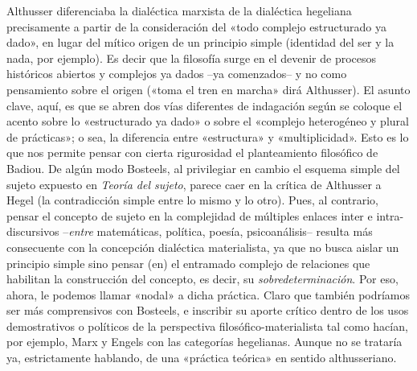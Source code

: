 Althusser diferenciaba la dialéctica marxista de la dialéctica hegeliana precisamente a partir de la consideración del «todo complejo estructurado ya dado», en lugar del mítico origen de un principio simple (identidad del ser y la nada, por ejemplo). Es decir que la filosofía surge en el devenir de procesos históricos abiertos y complejos ya dados --ya comenzados-- y no como pensamiento sobre el origen («toma el tren en marcha» dirá Althusser). El asunto clave, aquí, es que se abren dos vías diferentes de indagación según se coloque el acento sobre lo «estructurado ya dado» o sobre el «complejo heterogéneo y plural de prácticas»; o sea, la diferencia entre «estructura» y «multiplicidad». Esto es lo que nos permite pensar con cierta rigurosidad el planteamiento filosófico de Badiou. De algún modo Bosteels, al privilegiar en cambio el esquema simple del sujeto expuesto en \emph{Teoría del sujeto}, parece caer en la crítica de Althusser a Hegel (la contradicción simple entre lo mismo y lo otro). Pues, al contrario, pensar el concepto de sujeto en la complejidad de múltiples enlaces inter e intra-discursivos --\emph{entre} matemáticas, política, poesía, psicoanálisis-- resulta más consecuente con la concepción dialéctica materialista, ya que no busca aislar un principio simple sino pensar (en) el entramado complejo de relaciones que habilitan la construcción del concepto, es decir, su \emph{sobredeterminación}. Por eso, ahora, le podemos llamar «nodal» a dicha práctica. Claro que también podríamos ser más comprensivos con Bosteels, e inscribir su aporte crítico dentro de los usos demostrativos o políticos de la perspectiva filosófico-materialista tal como hacían, por ejemplo, Marx y Engels con las categorías hegelianas. Aunque no se trataría ya, estrictamente hablando, de una «práctica teórica» en sentido althusseriano.

